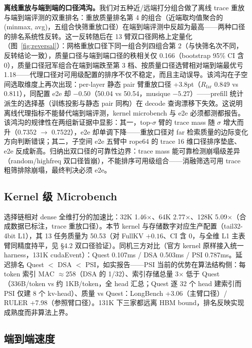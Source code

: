 \documentclass[11pt]{article}
\begin{document}
\textbf{离线重放与端到端的口径鸿沟。}我们对五种近/远端打分组合做了离线 trace 重放与端到端评测的双重排名：重放质量排名第 4 的组合（近端取均值聚合的 (minmax, avg)，五组合快筛重放口径）在端到端评测中反超为最高——两种口径的排名系统性反转。这一反转随后在 13 臂双口径网格上定量化（图~\ref{fig:reversal}）：网格重放口径下同一组合列四组合第 2（与快筛名次不同，反转结论一致），质量口径与端到端口径的秩相关仅 0.166（bootstrap 95\% CI 含 0），质量口径冠军组合在端到端跌至第 3 档、按质量口径选臂相对端到端最优亏 1.18——代理口径对可用级配置的排序不仅不稳定，而且主动误导。该鸿沟在子空间选取维度上再次出现：per-layer 静态 pair 臂重放口径 +3.8pt（$R_{\mathrm{far}}$ 0.849 vs 0.811），同配置 e2e 却 $-0.50$（50.04 vs 50.54，musique $-5.27$）——prefill 统计派生的选择基（训练投影与静态 pair 同构）在 decode 查询漂移下失效。这说明离线代理指标不能替代端到端评测，kernel microbench 与 e2e 必须都测都报告。该鸿沟的规律性在两组新证据中显影：其一，top-$\sigma$ 臂的 trace mass 随 $\sigma$ 增大而升（0.7352 $\rightarrow$ 0.7522），e2e 却单调下降——重放口径对 far 检索质量的边际变化方向判断错误；其二，子空间 e2e 五臂中 rope64 的 trace 16 维口径排序垫底、e2e 反成新高。归纳出双口径的可靠性边界：trace mass 能可靠检测崩塌级差异（random/highfreq 双口径皆崩），不能排序可用级组合——消融筛选可用 trace 粗筛排除崩塌，最终判决必须 e2e。

\subsection{Kernel 级 Microbench}

选择链相对 dense 全维打分的加速比：32K 1.46$\times$、64K 2.77$\times$、128K 5.09$\times$（合成数据已标注，trace 重放口径）。本节 kernel 与存储数字对应生产配置（tail32-4bit L1），其 13 任务质量为 50.53（对 FullKV $+0.16$、CI 含 0，与全维 L1 主表臂同精度持平，见 \S4.2 双口径验证）。同机三方对比（官方 kernel 原样接入统一 harness，131K cudaEvent）：Quest 0.107ms / DSA 0.503ms / PSI 0.787ms。延迟排名 Quest $<$ DSA $<$ PSI，如实报告——PSI 当前的优势在算法结构侧：每 token 索引 MAC $\approx$258（DSA 的 1/32）、索引存储总量 3$\times$ 低于 Quest（336B/token vs 约 1KB/token，全 head 汇总；Quest 逐 32 个 head 建索引而 PSI 仅建 8 个 kv-head）、质量 vs Quest：LongBench +3.06（主臂口径）/ RULER +7.98（参照臂口径）。131K 下三家都远离 HBM bound，排名反映实现成熟度而非算法上界。

\subsection{端到端速度}
\end{document}
